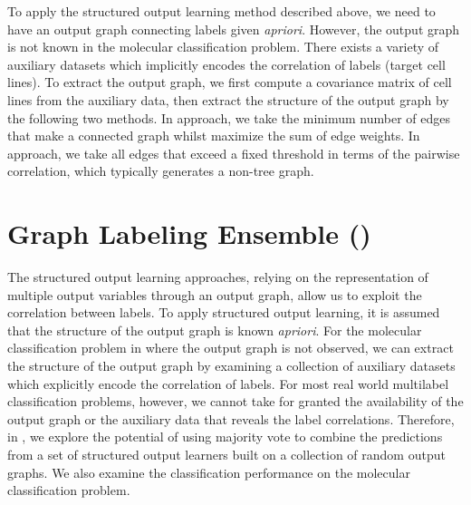 {%
To apply the structured output learning method described above, we need to have an output graph connecting labels given \textit{apriori}.
However, the output graph is not known in the molecular classification problem.
There exists a variety of auxiliary datasets \citep{Shoemaker06the} which implicitly encodes the correlation of labels (target cell lines).
To extract the output graph, we first compute a covariance matrix of cell lines from the auxiliary data, then extract the structure of the output graph by the following two methods.
In  approach, we take the minimum number of edges that make a connected graph whilst maximize the sum of edge weights.
In  approach, we take all edges that exceed a fixed threshold in terms of the pairwise correlation, which typically generates a non-tree graph.



%
%
\section{Graph Labeling Ensemble (\mve)}\label{sc_su11}

The structured output learning approaches, relying on the representation of multiple output variables through an output graph, allow us to exploit the correlation between labels.
To apply structured output learning, it is assumed that the structure of the output graph is known \textit{apriori}.
For the molecular classification problem in  where the output graph is not observed, we can extract the structure of the output graph by examining a collection of auxiliary datasets which explicitly encode the correlation of labels.
For most real world multilabel classification problems, however, we cannot take for granted the availability of the output graph or the auxiliary data that reveals the label correlations.
Therefore, in , we explore the potential of using majority vote to combine the predictions from a set of structured output learners built on a collection of random output graphs.
We also examine the classification performance on the molecular classification problem.


%
%
}
